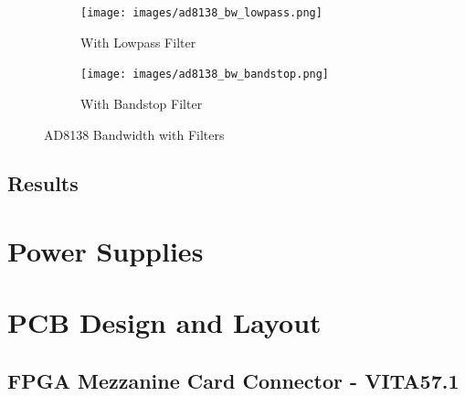 \documentclass[a4paper, 12pt]{article}
\begin{document}
\begin{figure}[ht]
\centering
\begin{subfigure}[b]{0.45\textwidth}
  \texttt{[image: images/ad8138\_bw\_lowpass.png]}
  \caption{With Lowpass Filter}
  \label{fig:ad8138_bw_lowpass}
\end{subfigure}
\begin{subfigure}[b]{0.45\textwidth}
  \texttt{[image: images/ad8138\_bw\_bandstop.png]}
  \caption{With Bandstop Filter}
  \label{fig:ad8138_bw_bandstop}
\end{subfigure}

\caption{AD8138 Bandwidth with Filters}
\label{fig:ad8138_bw_filters}
\end{figure}

\subsection{Results}

\section{Power Supplies}

\section{PCB Design and Layout}
\subsection{FPGA Mezzanine Card Connector - VITA57.1}

\clearpage


\end{document}
